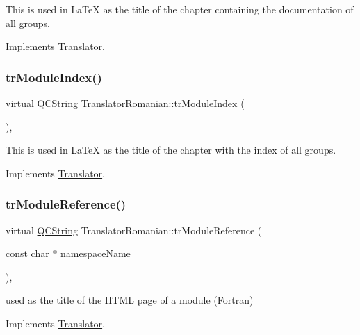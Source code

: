 This is used in La\+TeX as the title of the chapter containing the documentation of all groups. 

Implements \mbox{\hyperlink{class_translator}{Translator}}.

\mbox{\label{class_translator_romanian_afe66acf2e0f22478532fdaa5e6de2e9d}} 
\subsubsection{\texorpdfstring{trModuleIndex()}{trModuleIndex()}}
{\footnotesize\ttfamily virtual \mbox{\hyperlink{class_q_c_string}{Q\+C\+String}} Translator\+Romanian\+::tr\+Module\+Index (\begin{DoxyParamCaption}{ }\end{DoxyParamCaption})\hspace{0.3cm}{\ttfamily [inline]}, {\ttfamily [virtual]}}

This is used in La\+TeX as the title of the chapter with the index of all groups. 

Implements \mbox{\hyperlink{class_translator}{Translator}}.

\mbox{\label{class_translator_romanian_abdd1cca404195c59903fe58d35f6e3ea}} 
\subsubsection{\texorpdfstring{trModuleReference()}{trModuleReference()}}
{\footnotesize\ttfamily virtual \mbox{\hyperlink{class_q_c_string}{Q\+C\+String}} Translator\+Romanian\+::tr\+Module\+Reference (\begin{DoxyParamCaption}\item[{const char $\ast$}]{namespace\+Name }\end{DoxyParamCaption})\hspace{0.3cm}{\ttfamily [inline]}, {\ttfamily [virtual]}}

used as the title of the H\+T\+ML page of a module (Fortran) 

Implements \mbox{\hyperlink{class_translator}{Translator}}.

